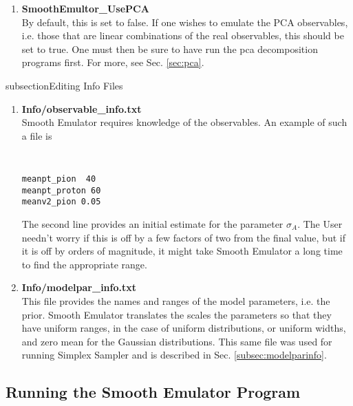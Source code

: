 \documentclass[main.tex]{subfiles}
\begin{document}
\begin{enumerate}
\item {\bf SmoothEmultor\_UsePCA}\\
By default, this is set to false. If one wishes to emulate the PCA observables, i.e. those that are linear combinations of the real observables, this should be set to true. One must then be sure to have run the pca decomposition programs first. For more, see Sec. \ref{sec:pca}. 

\end{enumerate}


subsection{Editing Info Files}

\begin{enumerate}

\item {\bf Info/observable\_info.txt}\\
Smooth Emulator requires knowledge of the observables. An example of such a file is
{\tt
\begin{verbatim}
meanpt_pion  40
meanpt_proton 60
meanv2_pion 0.05
\end{verbatim}
}
The second line provides an initial estimate for the parameter $\sigma_A$. The User needn't worry if this is off by a few factors of two from the final value, but if it is off by orders of magnitude, it might take Smooth Emulator a long time to find the appropriate range.

\item {\bf Info/modelpar\_info.txt}\\
This file provides the names and ranges of the model parameters, i.e. the prior. Smooth Emulator translates the scales the parameters so that they have uniform ranges, in the case of uniform distributions, or uniform widths, and zero mean for the Gaussian distributions. This same file was used for running Simplex Sampler and is described in Sec. \ref{subsec:modelparinfo}. 

\end{enumerate}

\subsection{Running the Smooth Emulator Program}
\end{document}
